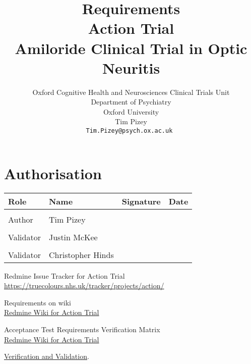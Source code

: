 \documentclass [12pt, a4paper, twoside, titlepage] {article}
\makeatletter
\newcommand{\projectShortProperName}{Action Trial}
\newcommand{\projectShortName}{action}
\newcommand{\projectTitle}{Amiloride Clinical Trial in Optic Neuritis}
\newcommand{\documentTypeTitle}{Requirements}
\newcommand{\authorName}{Tim Pizey}
\newcommand{\authorEmail}{Tim.Pizey@psych.ox.ac.uk}
\makeatother
\begin{document}
\sffamily
\allsectionsfont{\sffamily}


\title{
{\Huge \documentTypeTitle}
\\
\projectShortProperName 
\\ 
  {\small \projectTitle }
}

\author{
Oxford Cognitive Health and Neurosciences Clinical Trials Unit 
\\Department of Psychiatry
\\Oxford University
\\\authorName
\\\tt{\authorEmail}
}
\date{} %
\maketitle
\clearpage
\section{Authorisation}
\begin{tabular}{|p{2.5cm}|p{3cm}|p{5.5cm}|p{2.5cm}|}
\hline
\bf{Role} & \bf{Name} & \bf{Signature}& \bf{Date} \\ 
\hline
& & & \\
Author & \authorName   & & \\
& & & \\
Validator & Justin McKee	   & & \\
& & & \\
Validator & Christopher Hinds & & \\
\hline
\end{tabular}
\clearpage
\newpage

\begingroup
\hypersetup{linkcolor=blue}
\tableofcontents
\endgroup
\newpage


\begin{thebibliography}{scribe}


Redmine Issue Tracker for \projectShortProperName\\
\url{https://truecolours.nhs.uk/tracker/projects/\projectShortName/}

Requirements on wiki\\
\href{https://truecolours.nhs.uk/tracker/projects/\projectShortName/wiki/Requirements}
{Redmine Wiki for \projectShortProperName}


Acceptance Test Requirements Verification Matrix\\
\href{https://truecolours.nhs.uk/tracker/projects/\projectShortName/wiki/Acceptance_Test_Requirements_Verification_Matrix}
{Redmine Wiki for \projectShortProperName}

\href{http://en.wikipedia.org/wiki/Verification_and_validation_(software)}{Verification and Validation}.
\end{thebibliography}
\end{document}
